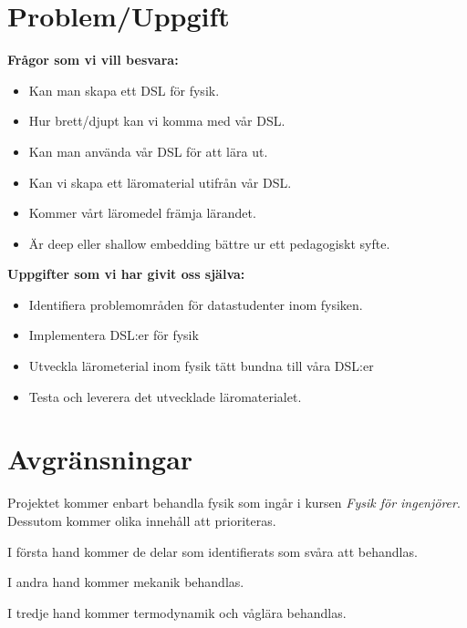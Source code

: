 \documentclass[12pt,a4paper]{article}
\begin{document}
\section{Problem/Uppgift}

\textbf{Frågor som vi vill besvara:}

\begin{itemize}
    \item Kan man skapa ett DSL för fysik.
    \item Hur brett/djupt kan vi komma med vår DSL.
    \item Kan man använda vår DSL för att lära ut.
    \item Kan vi skapa ett läromaterial utifrån vår DSL.
    \item Kommer vårt läromedel främja lärandet.
    \item Är deep eller shallow embedding bättre ur ett pedagogiskt syfte.
\end{itemize}

\textbf{Uppgifter som vi har givit oss själva:}

\begin{itemize}
    \item Identifiera problemområden för datastudenter inom fysiken.
    \item Implementera DSL:er för fysik
    \item Utveckla lärometerial inom fysik tätt bundna till våra DSL:er
    \item Testa och leverera det utvecklade läromaterialet.
\end{itemize}

\section{Avgränsningar}

Projektet kommer enbart behandla fysik som ingår i kursen \textit{Fysik för ingenjörer}.
Dessutom kommer olika innehåll att prioriteras.

I första hand kommer de delar som identifierats som svåra att behandlas.

I andra hand kommer mekanik behandlas.

I tredje hand kommer termodynamik och våglära behandlas.
\end{document}
